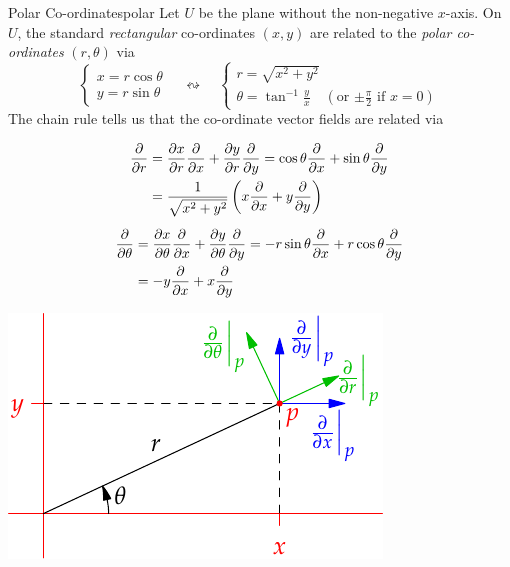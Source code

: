 \begin{example}{Polar Co-ordinates}{polar}
Let $U$ be the plane without the non-negative $x$-axis. On $U$, the standard \emph{rectangular} co-ordinates $(x,y)$ are related to the \emph{polar co-ordinates} $(r,\theta)$ via
\[\begin{cases}
x=r\cos\theta\\
y=r\sin\theta
\end{cases}\quad\leftrightsquigarrow\quad
\begin{cases}
r=\sqrt{x^2+y^2}\\
\theta=\tan^{-1}\frac yx\quad (\text{or $\pm\frac\pi 2$ if $x=0$})
\end{cases}\]
The chain rule tells us that the co-ordinate vector fields are related via\par
\begin{minipage}[t]{0.6\linewidth}\vspace{-10pt}
\begin{gather*}
\begin{aligned}
\partials r&=\partials[x]{r}\partials x+\partials[y]{r}\partials{y} =\cos\theta\partials x+\sin\theta\partials y\\
&=\frac 1{\sqrt{x^2+y^2}}\left(x\partials x+y\partials y\right)
\end{aligned}\\[5pt]
\begin{aligned}
\partials\theta&=\partials[x]{\theta}\partials x+\partials[y]{\theta}\partials{y} =-r\sin\theta\partials x+r\cos\theta\partials y\\
&=-y\partials x+x\partials y
\end{aligned}
\end{gather*}
\end{minipage}\hfill\begin{minipage}[t]{0.39\linewidth}\vspace{0pt}
\flushright\includegraphics{forms-polar}

\end{minipage}
\end{example}
